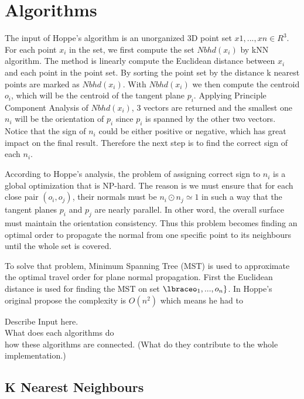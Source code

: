 \documentclass[acmcmpt, twoside]{acmsmall}
\begin{document}
   

\section{Algorithms}

The input of Hoppe's algorithm is an unorganized 3D point set ${x1,...,xn}\in R^3$. For each point $x_{i}$ in the set, we first compute the set $Nbhd(x_{i})$  by kNN algorithm. The method is linearly compute the Euclidean distance between $x_{i}$ and each point in the point set. By sorting the point set by the distance k nearest points are marked as $Nbhd(x_{i})$. With $Nbhd(x_{i})$ we then compute the centroid $o_{i}$, which will be the centroid of the tangent plane $p_{i}$. Applying Principle Component Analysis of $Nbhd(x_{i})$, 3 vectors are returned and the smallest one $n_{i}$ will be the orientation of $p_{i}$ since $p_{i}$ is spanned by the other two vectors. Notice that the sign of $n_{i}$ could be either positive or negative, which has great impact on the final result. Therefore the next step is to find the correct sign of each $n_{i}$.

According to Hoppe's analysis, the problem of assigning correct sign to $n_{i}$ is a global optimization that is NP-hard. The reason is we must ensure that for each close pair $(o_{i},o_{j})$, their normals must be $n_{i}{\odot}n_{j} {\simeq} 1$ in such a way that the tangent planes $p_{i}$ and $p_{j}$ are nearly parallel. In other word, the overall surface must maintain the orientation consistency. Thus this problem becomes finding an optimal order to propagate the normal from one specific point to its neighbours until the whole set is covered.

To solve that problem, Minimum Spanning Tree (MST) is used to approximate the optimal travel order for plane normal propagation. First the Euclidean distance is used for finding the MST on set $\lbraceo_{1},...,o_{n}\rbrace$. In Hoppe's original propose the complexity is $O(n^{2})$ which means he had to 

Describe Input here. \\
What does each algorithms do \\
how these algorithms are connected. (What do they contribute to the whole implementation.)
\subsection{K Nearest Neighbours}
\end{document}
